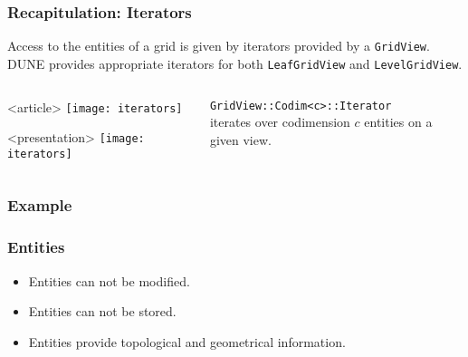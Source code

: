 \begin{frame}
  \frametitle{Recapitulation: Iterators}
  Access to the entities of a grid is given by iterators provided by a \lstinline!GridView!. DUNE provides
  appropriate iterators for both \lstinline!LeafGridView! and \lstinline!LevelGridView!.
  \begin{columns}
    \begin{column}{0.47\linewidth}
      \begin{center}
        \begin{onlyenv}<article>
          \texttt{[image: iterators]}
        \end{onlyenv}
      \end{center}
      \begin{onlyenv}<presentation>
        \texttt{[image: iterators]}
      \end{onlyenv}
    \end{column}
    \begin{column}{0.53\linewidth}
      \lstinline!GridView::Codim<c>::Iterator!\\ iterates over codimension
        $c$ entities on a given view.
    \end{column}
  \end{columns}
\end{frame}

\begin{frame}
  \frametitle{Example}
  
\end{frame}

\begin{frame} \frametitle{Entities}



  \begin{itemize}
  \item Entities can not be modified.
  \item Entities can not be stored.
  \item Entities provide topological and geometrical information.
  \end{itemize}
\end{frame}

